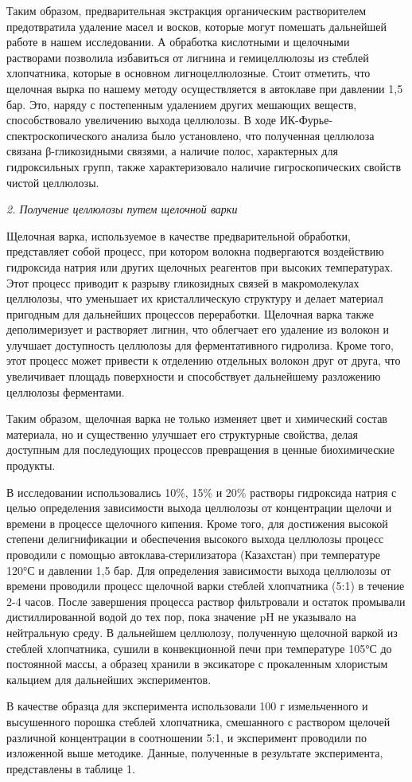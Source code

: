 \begin{multicols}{2}
Таким образом, предварительная экстракция органическим растворителем
предотвратила удаление масел и восков, которые могут помешать дальнейшей
работе в нашем исследовании. А обработка кислотными и щелочными
растворами позволила избавиться от лигнина и гемицеллюлозы из стеблей
хлопчатника, которые в основном лигноцеллюлозные. Стоит отметить, что
щелочная вырка по нашему методу осуществляется в автоклаве при давлении
1,5 бар. Это, наряду с постепенным удалением других мешающих веществ,
способствовало увеличению выхода целлюлозы. В ходе
ИК-Фурье-спектроскопического анализа было установлено, что полученная
целлюлоза связана β-гликозидными связями, а наличие полос, характерных
для гидроксильных групп, также характеризовало наличие гигроскопических
свойств чистой целлюлозы.

\emph{2. Получение целлюлозы путем щелочной варки}

Щелочная варка, используемое в качестве предварительной обработки,
представляет собой процесс, при котором волокна подвергаются воздействию
гидроксида натрия или других щелочных реагентов при высоких
температурах. Этот процесс приводит к разрыву гликозидных связей в
макромолекулах целлюлозы, что уменьшает их кристаллическую структуру и
делает материал пригодным для дальнейших процессов переработки. Щелочная
варка также деполимеризует и растворяет лигнин, что облегчает его
удаление из волокон и улучшает доступность целлюлозы для ферментативного
гидролиза. Кроме того, этот процесс может привести к отделению отдельных
волокон друг от друга, что увеличивает площадь поверхности и
способствует дальнейшему разложению целлюлозы ферментами.

Таким образом, щелочная варка не только изменяет цвет и химический
состав материала, но и существенно улучшает его структурные свойства,
делая доступным для последующих процессов превращения в ценные
биохимические продукты.

В исследовании использовались 10\%, 15\% и 20\% растворы гидроксида
натрия с целью определения зависимости выхода целлюлозы от концентрации
щелочи и времени в процессе щелочного кипения. Кроме того, для
достижения высокой степени делигнификации и обеспечения высокого выхода
целлюлозы процесс проводили с помощью автоклава-стерилизатора
(Казахстан) при температуре 120°С и давлении 1,5 бар. Для определения
зависимости выхода целлюлозы от времени проводили процесс щелочной варки
стеблей хлопчатника (5:1) в течение 2-4 часов. После завершения процесса
раствор фильтровали и остаток промывали дистиллированной водой до тех
пор, пока значение pH не указывало на нейтральную среду. В дальнейшем
целлюлозу, полученную щелочной варкой из стеблей хлопчатника, сушили в
конвекционной печи при температуре 105°С до постоянной массы, а образец
хранили в эксикаторе с прокаленным хлористым кальцием для дальнейших
экспериментов.

В качестве образца для эксперимента использовали 100 г измельченного и
высушенного порошка стеблей хлопчатника, смешанного с раствором щелочей
различной концентрации в соотношении 5:1, и эксперимент проводили по
изложенной выше методике. Данные, полученные в результате эксперимента,
представлены в таблице 1.
\end{multicols}

